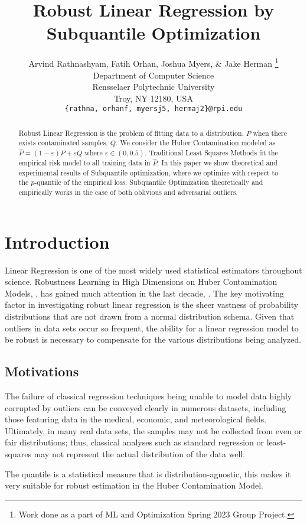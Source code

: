 \documentclass{article} %
\title{Robust Linear Regression by Subquantile Optimization}
\author{Arvind Rathnashyam, Fatih Orhan, Joshua Myers, \& Jake Herman  \thanks{ Work done as a part of ML and Optimization Spring 2023 Group Project.} \\
	Department of Computer Science\\
	Rensselaer Polytechnic University\\
	Troy, NY 12180, USA \\
	\texttt{\{rathna, orhanf, myersj5, hermaj2\}@rpi.edu} \\
}
\begin{document}
	
	\maketitle
	
	\begin{abstract}
		Robust Linear Regression is the problem of fitting data to a distribution, $P$ when there exists contaminated samples, $Q$. We consider the Huber Contamination modeled as $\hat{P} = (1-\varepsilon)P + \varepsilon Q$ where $\varepsilon \in (0,0.5)$. Traditional Least Squares Methods fit the empirical risk model to all training data in $\displaystyle \hat{P}$. In this paper we show theoretical and experimental results of Subquantile optimization, where we optimize with respect to the $p$-quantile of the empirical loss. Subquantile Optimization theoretically and empirically works in the case of both oblivious and adversarial outliers. 
	\end{abstract}
	
	\section{Introduction}
	
	Linear Regression is one of the most widely used statistical estimators throughout science. Robustness Learning in High Dimensions on Huber Contamination Models, \cite{Huber2009}, has gained much attention in the last decade, \cite{Diakonikolas2019RecentAI}. The key motivating factor in investigating robust linear regression is the sheer vastness of probability distributions that are not drawn from a normal distribution schema. Given that outliers in data sets occur so frequent, the ability for a linear regression model to be robust is necessary to compensate for the various distributions being analyzed. 
	\subsection{Motivations}
	The failure of classical regression techniques being unable to model data highly corrupted by outliers can be conveyed clearly in numerous datasets, including those featuring data in the medical, economic, and meteorological fields. Ultimately, in many real data sets, the samples may not be collected from even or fair distributions; thus, classical analyses such as standard regression or least-squares may not represent the actual distribution of the data well. 
	
	The quantile is a statistical measure that is distribution-agnostic, this makes it very suitable for robust estimation in the Huber Contamination Model. 
	
\end{document}
